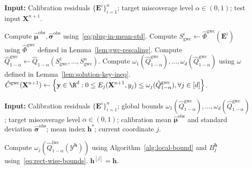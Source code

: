 \begin{algorithm}[!htb]
\caption{Global-Worst-Case TSCP (TSCP-GWC)}
\label{alg:global}
\textbf{Input:} Calibration residuals $\{\mathbf{E}^i\}_{i=1}^{n}$; target miscoverage level $\alpha\in(0,1)$; test input $\mathbf{X}^{n+1}$.
\begin{algorithmic}[1]
\State Compute $\hat{\boldsymbol\mu}^{\mathrm{obs}}, \hat{\boldsymbol\sigma}^{\mathrm{obs}}$ using~\eqref{eq:plug-in-mean-std}.
\State Compute $S^i_{\mathrm{gwc}}\gets \hat{\Phi}^{\mathrm{gwc}}(\mathbf{E}^i)$ using $\hat{\Phi}^{\mathrm{gwc}}$ defined in Lemma~\ref{lem:gwc-rescaling}.
\State Compute $\hat{Q}^{\mathrm{gwc}}_{1-\alpha} \gets \hat{Q}_{1-\alpha}(S^1_{\mathrm{gwc}},\dots, S^n_{\mathrm{gwc}})$.
\State Compute $\omega_1(\hat{Q}^{\mathrm{gwc}}_{1-\alpha}),\ldots,\omega_d(\hat{Q}^{\mathrm{gwc}}_{1-\alpha})$ using $\omega$ defined in Lemma~\ref{lem:solution-key-ineq}.
\State \Return $\displaystyle \hat{C}^{\mathrm{gwc}}(\mathbf{X}^{n+1}) \gets \left\{\mathbf y\in \R^d: 0\leq E_j(\mathbf{X}^{n+1}, y_j) \leq  \omega_j(\hat{Q}^{\mathrm{gwc}}_{1-\alpha}), \forall j \in [d]\right\}$.
\end{algorithmic} 
\end{algorithm}

\begin{algorithm}[!htbp]
\caption{Backward Search in Algorithm~\ref{alg:shortcut}}
\label{alg:backward}
\textbf{Input:} Calibration residuals $\{\mathbf{E}^i\}_{i=1}^{n}$; global bounds $\omega_1(\hat{Q}^{\mathrm{gwc}}_{1-\alpha}),\ldots,\omega_d(\hat{Q}^{\mathrm{gwc}}_{1-\alpha})$; target miscoverage level $\alpha\in(0,1)$; calibration mean $\hat{\boldsymbol\mu}^{\mathrm{obs}}$ and standard deviation $\hat{\boldsymbol\sigma}^{\mathrm{obs}}$; mean index $\mathbf{h}^*$; current coordinate $j$.
\begin{algorithmic}[1]
        \State Compute $\omega_j(\hat{Q}^{\mathrm{lwc}}_{1-\alpha}(\mathcal{Y}^{\mathbf{h}}))$ using Algorithm~\ref{alg:local-bound} and $B^{\mathbf{h}}_j$ using~\eqref{eq:rect-wise-bounds}.
            \State \Return $\mathbf{h}^{[j]} = \mathbf{h}$.
        \EndIf
    \EndFor
\end{algorithmic}
\end{algorithm}

